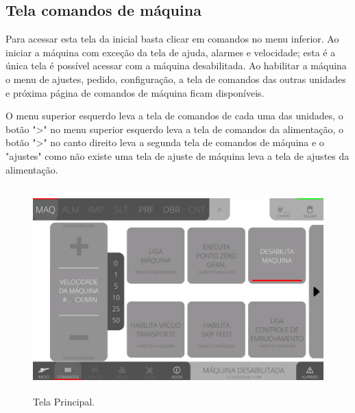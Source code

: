 \thispagestyle{fancy}

\vspace*{\fill}

\subsection{Tela comandos de máquina}

Para acessar esta tela da inicial basta clicar em comandos no menu inferior. Ao iniciar a máquina com exceção da tela de ajuda, alarmes e velocidade; esta é a única tela é possível acessar com a máquina desabilitada. Ao habilitar a máquina o menu de ajustes, pedido, configuração, a tela de comandos das outras unidades e próxima página de comandos de máquina ficam disponíveis.

O menu superior esquerdo leva a tela de comandos de cada uma das unidades, o botão "\textgreater" no menu superior esquerdo leva a tela de comandos da alimentação, o botão "\textgreater" no canto direito leva a segunda tela de comandos de máquina e o "ajustes" como não existe uma tela de ajuste de máquina leva a tela de ajustes da alimentação.

\vspace*{10pt}

\begin{figure}[h]
  \centering
  \includegraphics[width=480px,height=300px]{src/images/02-machine/e-Tela-Principal.png}
  \caption{Tela Principal.}
   \label{}
\end{figure}

\vspace*{\fill}

\newpage
\thispagestyle{fancy}

\vspace*{\fill}

